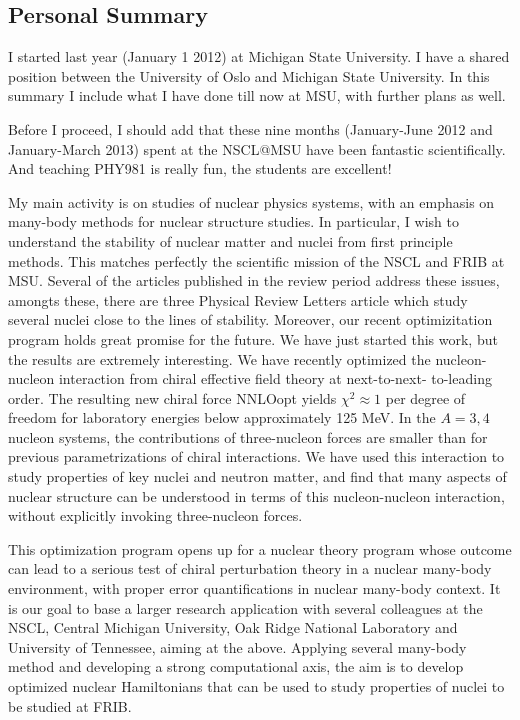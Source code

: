 \documentclass[prc,amsart,english,twocolumn,superscriptaddress,showpacs,floatfix]{revtex4}
\begin{document}
\subsection*{Personal Summary}

I started last year (January 1 2012) at Michigan State University. I have a shared position between the University of Oslo and Michigan State University. 
In this summary I include what I have done till now at MSU, with further plans as well. 

Before I proceed, I should add  that these nine months (January-June 2012 and January-March 2013) spent at the NSCL@MSU have been fantastic scientifically.  
And teaching PHY981 is really fun, the students are excellent!

My main activity is on studies of nuclear physics systems, with an emphasis on many-body methods for nuclear structure studies. In particular, 
I wish to understand the stability of nuclear matter and nuclei from first principle methods. This matches perfectly the scientific mission of the NSCL and FRIB at MSU.  
Several of the articles published in the review period address these issues, amongts these, there are three Physical Review Letters article which study several 
nuclei close to the lines of stability.
Moreover, our recent optimizitation program holds great promise for the future. 
We have just started this work, but the results are extremely interesting.
We have recently optimized the nucleon-nucleon interaction from chiral effective field theory at next-to-next- to-leading order. The resulting new chiral force NNLOopt yields $\chi^2 \approx 1$ per degree of freedom for laboratory energies below approximately 125 MeV. In the $A = 3, 4$ nucleon systems, the 
contributions of three-nucleon forces are smaller than for previous parametrizations of chiral interactions. We have used this interaction 
to study properties of key nuclei and neutron matter, and find that many aspects of nuclear structure can be understood in terms of this 
nucleon-nucleon interaction, without explicitly invoking three-nucleon forces.

This optimization program opens up for a nuclear theory program whose outcome can lead to a serious test of chiral perturbation theory in a nuclear many-body environment,
with proper error quantifications in  nuclear many-body context. 
It is our goal to base a larger research application with several colleagues at the NSCL, Central Michigan  University, 
Oak Ridge National Laboratory and University of Tennessee, aiming at the above. Applying several many-body method and  developing a strong
computational axis, the aim is to develop optimized nuclear Hamiltonians that can be used to study properties of nuclei to be studied at FRIB. 
\end{document}
